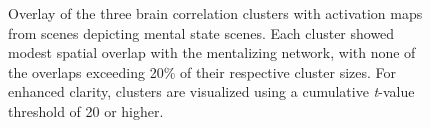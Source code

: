 \begin{figure}[!ht]
	\centering
	\caption{Overlay of the three brain correlation clusters with activation maps from scenes depicting mental state scenes. Each cluster showed modest spatial overlap with the mentalizing network, with none of the overlaps exceeding 20\% of their respective cluster sizes. For enhanced clarity, clusters are visualized using a cumulative \textit{t}-value threshold of 20 or higher.}
    \vspace*{-10pt}
	\label{fig:isc-fmri-overlap-sa}
\end{figure}

